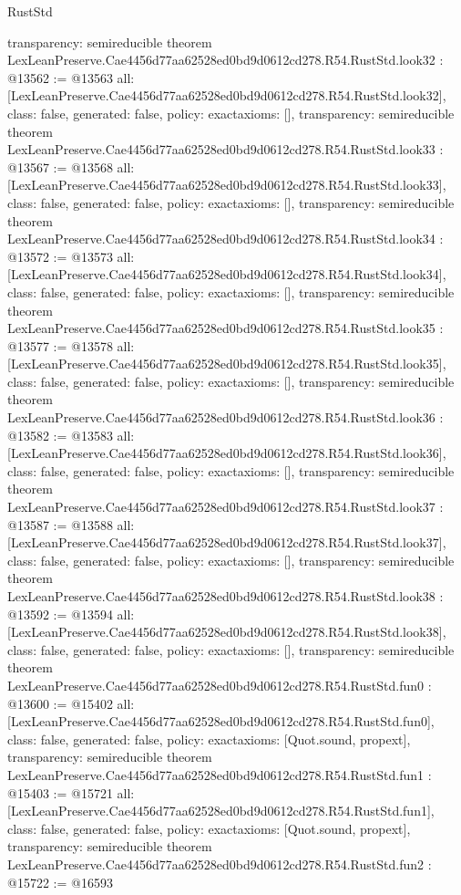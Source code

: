 \begin{lexlean}{RustStd}
\begin{coremodule}
{  transparency: semireducible
}
theorem LexLeanPreserve.Cae4456d77aa62528ed0bd9d0612cd278.R54.RustStd.look32 : @13562 := @13563 {
  all: [LexLeanPreserve.Cae4456d77aa62528ed0bd9d0612cd278.R54.RustStd.look32],
  class: false,
  generated: false,
  policy: exact{axioms: []},
  transparency: semireducible
}
theorem LexLeanPreserve.Cae4456d77aa62528ed0bd9d0612cd278.R54.RustStd.look33 : @13567 := @13568 {
  all: [LexLeanPreserve.Cae4456d77aa62528ed0bd9d0612cd278.R54.RustStd.look33],
  class: false,
  generated: false,
  policy: exact{axioms: []},
  transparency: semireducible
}
theorem LexLeanPreserve.Cae4456d77aa62528ed0bd9d0612cd278.R54.RustStd.look34 : @13572 := @13573 {
  all: [LexLeanPreserve.Cae4456d77aa62528ed0bd9d0612cd278.R54.RustStd.look34],
  class: false,
  generated: false,
  policy: exact{axioms: []},
  transparency: semireducible
}
theorem LexLeanPreserve.Cae4456d77aa62528ed0bd9d0612cd278.R54.RustStd.look35 : @13577 := @13578 {
  all: [LexLeanPreserve.Cae4456d77aa62528ed0bd9d0612cd278.R54.RustStd.look35],
  class: false,
  generated: false,
  policy: exact{axioms: []},
  transparency: semireducible
}
theorem LexLeanPreserve.Cae4456d77aa62528ed0bd9d0612cd278.R54.RustStd.look36 : @13582 := @13583 {
  all: [LexLeanPreserve.Cae4456d77aa62528ed0bd9d0612cd278.R54.RustStd.look36],
  class: false,
  generated: false,
  policy: exact{axioms: []},
  transparency: semireducible
}
theorem LexLeanPreserve.Cae4456d77aa62528ed0bd9d0612cd278.R54.RustStd.look37 : @13587 := @13588 {
  all: [LexLeanPreserve.Cae4456d77aa62528ed0bd9d0612cd278.R54.RustStd.look37],
  class: false,
  generated: false,
  policy: exact{axioms: []},
  transparency: semireducible
}
theorem LexLeanPreserve.Cae4456d77aa62528ed0bd9d0612cd278.R54.RustStd.look38 : @13592 := @13594 {
  all: [LexLeanPreserve.Cae4456d77aa62528ed0bd9d0612cd278.R54.RustStd.look38],
  class: false,
  generated: false,
  policy: exact{axioms: []},
  transparency: semireducible
}
theorem LexLeanPreserve.Cae4456d77aa62528ed0bd9d0612cd278.R54.RustStd.fun0 : @13600 := @15402 {
  all: [LexLeanPreserve.Cae4456d77aa62528ed0bd9d0612cd278.R54.RustStd.fun0],
  class: false,
  generated: false,
  policy: exact{axioms: [Quot.sound, propext]},
  transparency: semireducible
}
theorem LexLeanPreserve.Cae4456d77aa62528ed0bd9d0612cd278.R54.RustStd.fun1 : @15403 := @15721 {
  all: [LexLeanPreserve.Cae4456d77aa62528ed0bd9d0612cd278.R54.RustStd.fun1],
  class: false,
  generated: false,
  policy: exact{axioms: [Quot.sound, propext]},
  transparency: semireducible
}
theorem LexLeanPreserve.Cae4456d77aa62528ed0bd9d0612cd278.R54.RustStd.fun2 : @15722 := @16593 {
}
\end{coremodule}
\end{lexlean}
